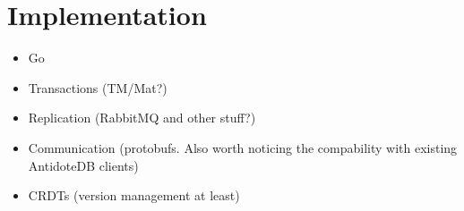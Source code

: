 \documentclass{vldb}
\newcommand{\grumbler}[2]{{\color{red}{\bf #1:} #2}}
\renewcommand{\grumbler}[2]{}
\newcommand{\andre}[1]{\grumbler{andre}{#1}}
\begin{document}
\andre{I ended up describing the topics of system description in other subsections, apart from Structure. I don't recall going into much detail of what a CRDT is, but that shouldn't be necessary anyway.}

\section{Implementation}

\begin{itemize}
	\item Go
	\item Transactions (TM/Mat?)
	\item Replication (RabbitMQ and other stuff?)
	\item Communication (protobufs. Also worth noticing the compability with existing AntidoteDB clients)
	\item CRDTs (version management at least)
\end{itemize}

\andre{A good part of the implementation is already included in other sections, at least indirectly. Mainly Replication and to an extent Transactions/Communication. We need to decide what really is important to refer in the "implementation" section.}
\end{document}
